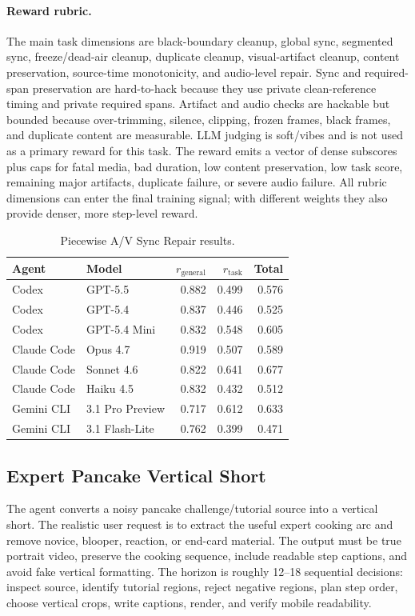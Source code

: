 \documentclass[11pt]{article}
\begin{document}
\paragraph{Reward rubric.}
The main task dimensions are black-boundary cleanup, global sync, segmented sync, freeze/dead-air cleanup, duplicate cleanup, visual-artifact cleanup, content preservation, source-time monotonicity, and audio-level repair. Sync and required-span preservation are hard-to-hack because they use private clean-reference timing and private required spans. Artifact and audio checks are hackable but bounded because over-trimming, silence, clipping, frozen frames, black frames, and duplicate content are measurable. LLM judging is soft/vibes and is not used as a primary reward for this task. The reward emits a vector of dense subscores plus caps for fatal media, bad duration, low content preservation, low task score, remaining major artifacts, duplicate failure, or severe audio failure. All rubric dimensions can enter the final training signal; with different weights they also provide denser, more step-level reward.

\begin{table}[H]
\centering
\small
\begin{tabular}{llrrr}
\toprule
Agent & Model & \(r_{\mathrm{general}}\) & \(r_{\mathrm{task}}\) & Total \\
\midrule
Codex & GPT-5.5 & 0.882 & 0.499 & 0.576 \\
Codex & GPT-5.4 & 0.837 & 0.446 & 0.525 \\
Codex & GPT-5.4 Mini & 0.832 & 0.548 & 0.605 \\
Claude Code & Opus 4.7 & 0.919 & 0.507 & 0.589 \\
Claude Code & Sonnet 4.6 & 0.822 & 0.641 & 0.677 \\
Claude Code & Haiku 4.5 & 0.832 & 0.432 & 0.512 \\
Gemini CLI & 3.1 Pro Preview & 0.717 & 0.612 & 0.633 \\
Gemini CLI & 3.1 Flash-Lite & 0.762 & 0.399 & 0.471 \\
\bottomrule
\end{tabular}
\caption{Piecewise A/V Sync Repair results.}
\end{table}

\subsection{Expert Pancake Vertical Short}

The agent converts a noisy pancake challenge/tutorial source into a vertical short. The realistic user request is to extract the useful expert cooking arc and remove novice, blooper, reaction, or end-card material. The output must be true portrait video, preserve the cooking sequence, include readable step captions, and avoid fake vertical formatting. The horizon is roughly 12--18 sequential decisions: inspect source, identify tutorial regions, reject negative regions, plan step order, choose vertical crops, write captions, render, and verify mobile readability.
\end{document}
